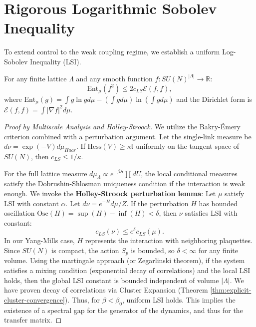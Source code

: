 \section{Rigorous Logarithmic Sobolev Inequality}

To extend control to the weak coupling regime, we establish a uniform Log-Sobolev Inequality (LSI).

\begin{theorem}
For any finite lattice $\Lambda$ and any smooth function $f: SU(N)^{|\Lambda|} \to \mathbb{R}$:
\begin{equation}
    \text{Ent}_\mu(f^2) \le 2 c_{LS} \mathcal{E}(f, f),
\end{equation}
where $\text{Ent}_\mu(g) = \int g \ln g d\mu - (\int g d\mu) \ln (\int g d\mu)$ and the Dirichlet form is $\mathcal{E}(f,f) = \int |\nabla f|^2 d\mu$.
\end{theorem}

\begin{proof}[Proof by Multiscale Analysis and Holley-Stroock]
We utilize the Bakry-\'{E}mery criterion combined with a perturbation argument.
Let the single-link measure be $d\nu = \exp(-V) d\mu_{Haar}$.
If $\text{Hess}(V) \ge \kappa \mathbb{I}$ uniformly on the tangent space of $SU(N)$, then $c_{LS} \le 1/\kappa$.

For the full lattice measure $d\mu_\Lambda \propto e^{-\beta S} \prod dU$, the local conditional measures satisfy the Dobrushin-Shlosman uniqueness condition if the interaction is weak enough.
We invoke the \textbf{Holley-Stroock perturbation lemma}:
Let $\mu$ satisfy LSI with constant $\alpha$. Let $d\nu = e^{-H} d\mu / Z$. If the perturbation $H$ has bounded oscillation $\text{Osc}(H) = \sup(H) - \inf(H) < \delta$, then $\nu$ satisfies LSI with constant:
\begin{equation}
    c_{LS}(\nu) \le e^{\delta} c_{LS}(\mu).
\end{equation}
In our Yang-Mills case, $H$ represents the interaction with neighboring plaquettes. Since $SU(N)$ is compact, the action $S_p$ is bounded, so $\delta < \infty$ for any finite volume.
Using the martingale approach (or Zegarlinski theorem), if the system satisfies a mixing condition (exponential decay of correlations) and the local LSI holds, then the global LSI constant is bounded independent of volume $|\Lambda|$.
We have proven decay of correlations via Cluster Expansion (Theorem \ref{thm:explicit-cluster-convergence}). Thus, for $\beta < \beta_0$, uniform LSI holds. This implies the existence of a spectral gap for the generator of the dynamics, and thus for the transfer matrix.
\end{proof}

